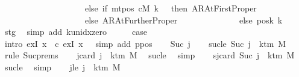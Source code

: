 \begin{isabellebody}
\ \ \ \ \ \ \ \ \ \ \ \ \ \ \ \ \ \ \ \ else\ if\ mt{\isacharunderscore}{\kern0pt}pos\ cM\ k\ {\isacharequal}{\kern0pt}\ {}\ then\ AR{\isacharunderscore}{\kern0pt}AtFirstProper\isanewline
\ \ \ \ \ \ \ \ \ \ \ \ \ \ \ \ \ \ \ \ else\ AR{\isacharunderscore}{\kern0pt}AtFurtherProper{\isacharparenright}{\kern0pt}\isanewline
\ \ \ \ \ \ \ \ \ \ \ \ \ \ else\ posk{}\ k{\isacharparenright}{\kern0pt}{\isacharparenright}{\kern0pt}{\isachardoublequoteclose}\isanewline
\ \ \ \ \isamarkupfalse%
\ stg{}\ \isamarkupfalse%
\ {\isacharparenleft}{\kern0pt}simp\ add{\isacharcolon}{\kern0pt}\ k{\isacharunderscore}{\kern0pt}unidx{\isacharunderscore}{\kern0pt}zero{\isacharparenright}{\kern0pt}\isanewline
\ \ \isamarkupfalse%
\ \isamarkupfalse%
\ {\isacharquery}{\kern0pt}case\isanewline
\ \ \ \ \isamarkupfalse%
\ {\isacharparenleft}{\kern0pt}intro\ exI{\isacharbrackleft}{\kern0pt}\ x\ {\isacharequal}{\kern0pt}\ c{}{\isacharbrackright}{\kern0pt}\ exI{\isacharbrackleft}{\kern0pt}\ x\ {\isacharequal}{\kern0pt}\ {}{\isacharbrackright}{\kern0pt}{\isacharparenright}{\kern0pt}\ {\isacharparenleft}{\kern0pt}simp\ add{\isacharcolon}{\kern0pt}\ ppos{\isacharparenright}{\kern0pt}\isanewline
{}\isamarkupfalse%
\isanewline
\ \ \isamarkupfalse%
\ {\isacharparenleft}{\kern0pt}Suc\ j{\isacharparenright}{\kern0pt}\isanewline
\ \ \isamarkupfalse%
\ sucle{\isacharcolon}{\kern0pt}\ {\isachardoublequoteopen}Suc\ j\ {\isasymle}\ k{\isacharunderscore}{\kern0pt}tm\ M\ {\isacharminus}{\kern0pt}\ {}{\isachardoublequoteclose}\ \isamarkupfalse%
\ {\isacharparenleft}{\kern0pt}rule\ Suc{\isachardot}{\kern0pt}prems{\isacharparenright}{\kern0pt}\isanewline
\ \ \isamarkupfalse%
\ jcard{\isacharcolon}{\kern0pt}\ {\isachardoublequoteopen}j\ {\isacharless}{\kern0pt}\ k{\isacharunderscore}{\kern0pt}tm\ M{\isachardoublequoteclose}\ \isamarkupfalse%
\ sucle\ \isamarkupfalse%
\ simp\isanewline
\ \ \isamarkupfalse%
\ sjcard{\isacharcolon}{\kern0pt}\ {\isachardoublequoteopen}Suc\ j\ {\isacharless}{\kern0pt}\ k{\isacharunderscore}{\kern0pt}tm\ M{\isachardoublequoteclose}\ \isamarkupfalse%
\ sucle\ \isamarkupfalse%
\ simp\isanewline
\ \ \isamarkupfalse%
\ jle{\isacharcolon}{\kern0pt}\ {\isachardoublequoteopen}j\ {\isasymle}\ k{\isacharunderscore}{\kern0pt}tm\ M\ {\isacharminus}{\kern0pt}\ {}{\isachardoublequoteclose}\ \isamarkupfalse%

\end{isabellebody}
